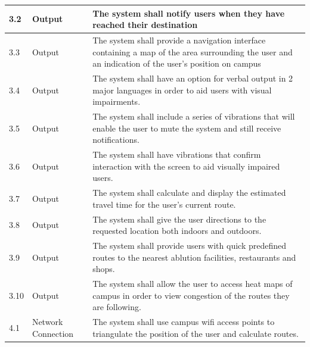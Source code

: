 \documentclass[12pt]{article}
\begin{document}
\begin{longtable}{|p{}| p{} | p{} |}
\hline

3.2& Output &The system shall notify users when they have reached their destination \\

\hline

3.3& Output & The system shall provide a navigation interface containing a map of the area surrounding the user and an indication of the user's position on campus\\

\hline

3.4& Output & The system shall have an option for verbal output in 2 major languages in order to aid users with visual impairments.\\

\hline

3.5& Output & The system shall include a series of vibrations that will enable the user to mute the system and still receive notifications.\\

\hline

3.6& Output & The system shall have vibrations that confirm interaction with the screen to aid visually impaired users.\\

\hline

3.7& Output & The system shall calculate and display the estimated travel time for the user's current route.\\

\hline

3.8& Output & The system shall give the user directions to the requested location both indoors and outdoors.\\

\hline

3.9& Output& The system shall provide users with quick predefined routes to the nearest ablution facilities, restaurants and shops.\\

\hline

3.10& Output& The system shall allow the user to access heat maps of campus in order to view congestion of the routes they are following.\\

\hline

4.1& Network Connection & The system shall use campus wifi access points to triangulate the position of the user and calculate routes.  \\

\hline


\end{longtable}
\end{document}
